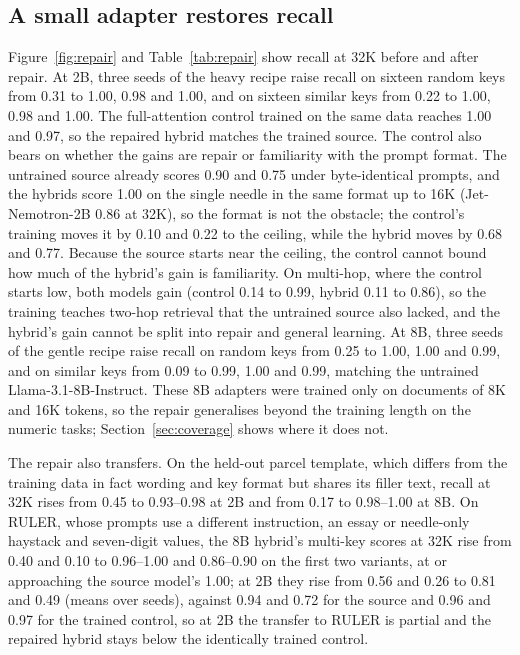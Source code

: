 \documentclass[11pt]{article}
\begin{document}
\begin{table}[t]
\centering\footnotesize\setlength{\tabcolsep}{3.5pt}
\caption{Recall at 32K before repair. Suite columns use 100 cases per cell; RULER columns use 50. MK1--MK3: RULER multi-key variants 1--3; MV: multi-value, a lower bound under the 64-token generation limit, loose at 2B (Section~\ref{sec:ruler}). Parcels is the held-out fact template.}
\label{tab:signature}

\end{table}

\subsection{A small adapter restores recall}
\label{sec:results-repair}
Figure~\ref{fig:repair} and Table~\ref{tab:repair} show recall at 32K before and after repair. At 2B, three seeds of the heavy recipe raise recall on sixteen random keys from 0.31 to 1.00, 0.98 and 1.00, and on sixteen similar keys from 0.22 to 1.00, 0.98 and 1.00. The full-attention control trained on the same data reaches 1.00 and 0.97, so the repaired hybrid matches the trained source. The control also bears on whether the gains are repair or familiarity with the prompt format. The untrained source already scores 0.90 and 0.75 under byte-identical prompts, and the hybrids score 1.00 on the single needle in the same format up to 16K (Jet-Nemotron-2B 0.86 at 32K), so the format is not the obstacle; the control's training moves it by 0.10 and 0.22 to the ceiling, while the hybrid moves by 0.68 and 0.77. Because the source starts near the ceiling, the control cannot bound how much of the hybrid's gain is familiarity. On multi-hop, where the control starts low, both models gain (control 0.14 to 0.99, hybrid 0.11 to 0.86), so the training teaches two-hop retrieval that the untrained source also lacked, and the hybrid's gain cannot be split into repair and general learning. At 8B, three seeds of the gentle recipe raise recall on random keys from 0.25 to 1.00, 1.00 and 0.99, and on similar keys from 0.09 to 0.99, 1.00 and 0.99, matching the untrained Llama-3.1-8B-Instruct. These 8B adapters were trained only on documents of 8K and 16K tokens, so the repair generalises beyond the training length on the numeric tasks; Section~\ref{sec:coverage} shows where it does not.

The repair also transfers. On the held-out parcel template, which differs from the training data in fact wording and key format but shares its filler text, recall at 32K rises from 0.45 to 0.93--0.98 at 2B and from 0.17 to 0.98--1.00 at 8B. On RULER, whose prompts use a different instruction, an essay or needle-only haystack and seven-digit values, the 8B hybrid's multi-key scores at 32K rise from 0.40 and 0.10 to 0.96--1.00 and 0.86--0.90 on the first two variants, at or approaching the source model's 1.00; at 2B they rise from 0.56 and 0.26 to 0.81 and 0.49 (means over seeds), against 0.94 and 0.72 for the source and 0.96 and 0.97 for the trained control, so at 2B the transfer to RULER is partial and the repaired hybrid stays below the identically trained control.
\end{document}
